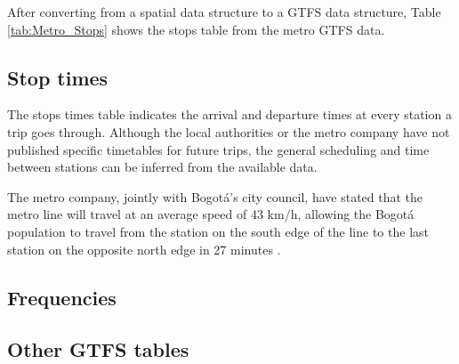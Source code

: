 \documentclass[12pt, a4paper]{report}
\begin{document}
After converting from a spatial data structure to a GTFS data structure, Table \ref{tab:Metro_Stops} shows the stops table from the metro GTFS data.

\begin{table}[ht]
\centering
{}
\caption{Metro stops table.}
\label{tab:Metro_Stops}
\end{table}

\subsection{Stop times}

The stops times table indicates the arrival and departure times at every station a trip goes through. Although the local authorities or the metro company have not published specific timetables for future trips, the general scheduling and time between stations can be inferred from the available data.

The metro company, jointly with Bogotá's city council, have stated that the metro line will travel at an average speed of 43 km/h, allowing the Bogotá population to travel from the station on the south edge of the line to the last station on the opposite north edge in 27 minutes .




\subsection{Frequencies}
\subsection{Other GTFS tables}
\end{document}

